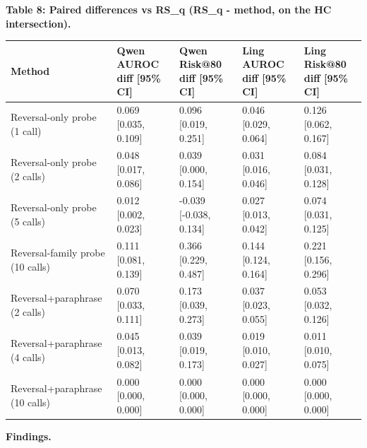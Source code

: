\documentclass[11pt]{article}
\begin{document}
\textbf{Table 8: Paired differences vs RS\_q (RS\_q - method, on the HC intersection).}

\begin{table}[t]
\centering
\small
\begin{tabular}{lllll}
\toprule
Method & Qwen AUROC diff [95\% CI] & Qwen Risk@80 diff [95\% CI] & Ling AUROC diff [95\% CI] & Ling Risk@80 diff [95\% CI] \\
\midrule
Reversal-only probe (1 call) & 0.069 [0.035, 0.109] & 0.096 [0.019, 0.251] & 0.046 [0.029, 0.064] & 0.126 [0.062, 0.167] \\
Reversal-only probe (2 calls) & 0.048 [0.017, 0.086] & 0.039 [0.000, 0.154] & 0.031 [0.016, 0.046] & 0.084 [0.031, 0.128] \\
Reversal-only probe (5 calls) & 0.012 [0.002, 0.023] & -0.039 [-0.038, 0.134] & 0.027 [0.013, 0.042] & 0.074 [0.031, 0.125] \\
Reversal-family probe (10 calls) & 0.111 [0.081, 0.139] & 0.366 [0.229, 0.487] & 0.144 [0.124, 0.164] & 0.221 [0.156, 0.296] \\
Reversal+paraphrase (2 calls) & 0.070 [0.033, 0.111] & 0.173 [0.039, 0.273] & 0.037 [0.023, 0.055] & 0.053 [0.032, 0.126] \\
Reversal+paraphrase (4 calls) & 0.045 [0.013, 0.082] & 0.039 [0.019, 0.173] & 0.019 [0.010, 0.027] & 0.011 [0.010, 0.075] \\
Reversal+paraphrase (10 calls) & 0.000 [0.000, 0.000] & 0.000 [0.000, 0.000] & 0.000 [0.000, 0.000] & 0.000 [0.000, 0.000] \\
\bottomrule
\end{tabular}
\end{table}


\textbf{Findings.}
\end{document}
